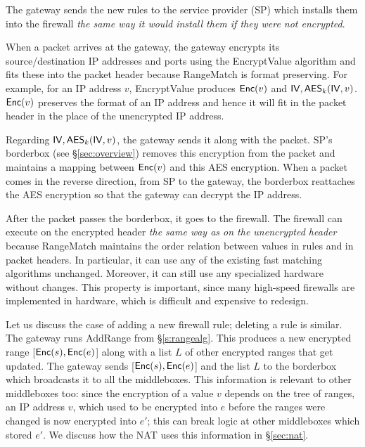 




The gateway sends the new rules to the service provider (SP) which installs them into the firewall {\em the same way it would install 
them if they were not encrypted}. 

When a packet arrives at the gateway, the gateway encrypts its source/destination IP addresses and ports using the EncryptValue algorithm
and fits these into the packet header because RangeMatch is format preserving.
For example, for an IP address $v$, EncryptValue produces $\mathsf{Enc}(v)$ and $\mathsf{IV}, \mathsf{AES}_k(\mathsf{IV}, v)$.
 $\mathsf{Enc}(v)$ preserves the format of an IP address and hence 
it will fit in the packet header in the place of the unencrypted IP address.

Regarding $\mathsf{IV}, \mathsf{AES}_k(\mathsf{IV}, v)$, the gateway sends it along with the packet. SP's borderbox (see \S\ref{sec:overview})
removes this encryption from the packet and maintains a mapping between $\mathsf{Enc}(v)$  and this AES encryption. 
When a packet comes in the reverse direction, from SP to the gateway, the borderbox reattaches the AES encryption so that the
gateway can decrypt the IP address.

After the packet passes the borderbox, it goes to the firewall. The firewall can execute on the encrypted header {\em
the same way as on the unencrypted header} because RangeMatch maintains the order relation between values in rules and in 
packet headers. 
In particular, it can use any of the existing fast matching algorithms unchanged. 
Moreover, it can still use  any specialized hardware without changes. This property is important, since many high-speed firewalls are implemented in hardware, which is difficult and expensive to redesign.


Let us discuss the case of adding a new firewall rule; deleting a rule is similar.
The gateway runs AddRange from \S\ref{s:rangealg}. This produces a new encrypted range [$\mathsf{Enc}(s), \mathsf{Enc}(e)$] 
along with a list $L$ of other encrypted ranges that get updated. The gateway sends [$\mathsf{Enc}(s), \mathsf{Enc}(e)$] 
 and the list $L$ to the borderbox which broadcasts it to all the middleboxes.
This information is relevant to other middleboxes too: since the encryption of a value $v$ depends on the tree of ranges, an IP address $v$, which used to be encrypted into $e$ before the ranges were changed is now encrypted into $e'$; this can break logic at other middleboxes which stored $e'$. We discuss how the NAT uses this information in \S\ref{sec:nat}.

